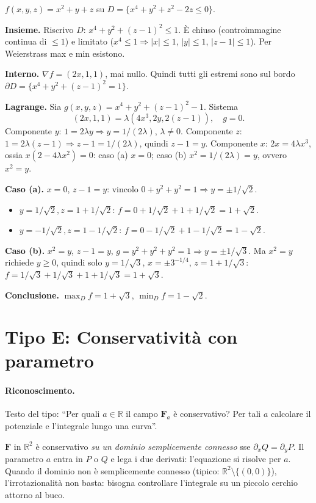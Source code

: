 \documentclass[11pt,a4paper,openany]{book}
\theoremstyle{plain}
\theoremstyle{definition}
\theoremstyle{remark}
\newcommand{\R}{\mathbb{R}}
\newcommand{\F}{\mathbf{F}}
\begin{document}
\begin{esempio}[title={19/6/2024 --- Esercizio 2}]
$f(x,y,z)=x^2+y+z$ su $D=\{x^4+y^2+z^2-2z\le 0\}$.

\textbf{Insieme.} Riscrivo $D$: $x^4+y^2+(z-1)^2\le 1$.
\`E chiuso (controimmagine continua di $\le 1$) e limitato
($x^4\le 1\Rightarrow|x|\le 1$, $|y|\le 1$, $|z-1|\le 1$). Per
Weierstrass max e min esistono.

\textbf{Interno.} $\nabla f=(2x,1,1)$, mai nullo. Quindi tutti gli
estremi sono sul bordo $\partial D=\{x^4+y^2+(z-1)^2=1\}$.

\textbf{Lagrange.} Sia $g(x,y,z)=x^4+y^2+(z-1)^2-1$. Sistema
\[
(2x,1,1)=\lambda(4x^3,2y,2(z-1)),\quad g=0.
\]
Componente $y$: $1=2\lambda y\Rightarrow y=1/(2\lambda)$,
$\lambda\ne 0$.
Componente $z$: $1=2\lambda(z-1)\Rightarrow z-1=1/(2\lambda)$,
quindi $z-1=y$.
Componente $x$: $2x=4\lambda x^3$, ossia $x(2-4\lambda x^2)=0$:
caso (a) $x=0$; caso (b) $x^2=1/(2\lambda)=y$, ovvero $x^2=y$.

\textbf{Caso (a).} $x=0$, $z-1=y$: vincolo
$0+y^2+y^2=1\Rightarrow y=\pm 1/\sqrt2$.
\begin{itemize}
\item $y=1/\sqrt2,z=1+1/\sqrt2$:
$f=0+1/\sqrt2+1+1/\sqrt2=1+\sqrt2$.
\item $y=-1/\sqrt2,z=1-1/\sqrt2$:
$f=0-1/\sqrt2+1-1/\sqrt2=1-\sqrt2$.
\end{itemize}

\textbf{Caso (b).} $x^2=y$, $z-1=y$, $g=y^2+y^2+y^2=1\Rightarrow y=\pm1/\sqrt3$.
Ma $x^2=y$ richiede $y\ge 0$, quindi solo $y=1/\sqrt3$,
$x=\pm 3^{-1/4}$, $z=1+1/\sqrt3$:
$f=1/\sqrt3+1/\sqrt3+1+1/\sqrt3=1+\sqrt3$.

\textbf{Conclusione.}
$\max_D f=1+\sqrt3$, $\min_D f=1-\sqrt2$.
\end{esempio}

\section{Tipo E: Conservativit\`a con parametro}

\paragraph{Riconoscimento.} Testo del tipo:
``Per quali $a\in\R$ il campo $\F_a$ \`e conservativo? Per tali $a$
calcolare il potenziale e l'integrale lungo una curva''.

\begin{nota}[title={Intuizione}]
$\F$ in $\R^2$ \`e conservativo \emph{su un dominio semplicemente connesso}
sse $\partial_x Q=\partial_y P$. Il parametro $a$ entra in $P$ o $Q$
e lega i due derivati: l'equazione si risolve per $a$. Quando il
dominio non \`e semplicemente connesso (tipico: $\R^2\setminus\{(0,0)\}$),
l'irrotazionalit\`a non basta: bisogna controllare l'integrale su un
piccolo cerchio attorno al buco.
\end{nota}
\end{document}
